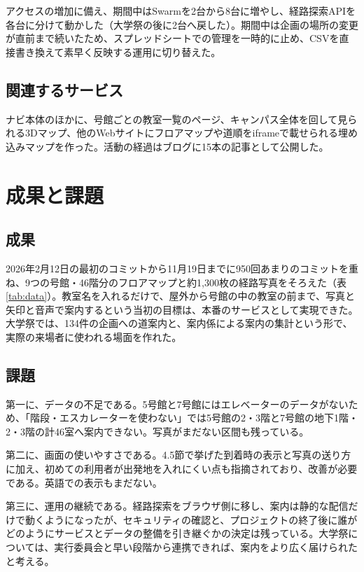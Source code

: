 \documentclass[
  paper=a4paper,
  fontsize=10.5pt,
  jafontsize=10.5pt,
  twocolumn,
  line_length=82.5mm,   %
  column_gap=5mm,
  gutter=20mm,          %
  number_of_lines=35,   %
  head_space=25mm,      %
  baselineskip=20.36pt, %
]{jlreq}
\begin{document}
アクセスの増加に備え、期間中はSwarmを2台から8台に増やし、経路探索APIを各台に分けて動かした（大学祭の後に2台へ戻した）。期間中は企画の場所の変更が直前まで続いたため、スプレッドシートでの管理を一時的に止め、CSVを直接書き換えて素早く反映する運用に切り替えた。

\subsection{関連するサービス}

ナビ本体のほかに、号館ごとの教室一覧のページ、キャンパス全体を回して見られる3Dマップ、他のWebサイトにフロアマップや道順をiframeで載せられる埋め込みマップを作った。活動の経過はブログに15本の記事として公開した。

\section{成果と課題}

\subsection{成果}

2026年2月12日の最初のコミットから11月19日までに950回あまりのコミットを重ね、9つの号館・46階分のフロアマップと約1,300枚の経路写真をそろえた（表\ref{tab:data}）。教室名を入れるだけで、屋外から号館の中の教室の前まで、写真と矢印と音声で案内するという当初の目標は、本番のサービスとして実現できた。大学祭では、134件の企画への道案内と、案内係による案内の集計という形で、実際の来場者に使われる場面を作れた。

\subsection{課題}

第一に、データの不足である。5号館と7号館にはエレベーターのデータがないため、「階段・エスカレーターを使わない」では5号館の2・3階と7号館の地下1階・2・3階の計46室へ案内できない。写真がまだない区間も残っている。

第二に、画面の使いやすさである。4.5節で挙げた到着時の表示と写真の送り方に加え、初めての利用者が出発地を入れにくい点も指摘されており、改善が必要である。英語での表示もまだない。

第三に、運用の継続である。経路探索をブラウザ側に移し、案内は静的な配信だけで動くようになったが、セキュリティの確認と、プロジェクトの終了後に誰がどのようにサービスとデータの整備を引き継ぐかの決定は残っている。大学祭については、実行委員会と早い段階から連携できれば、案内をより広く届けられたと考える。
\end{document}
